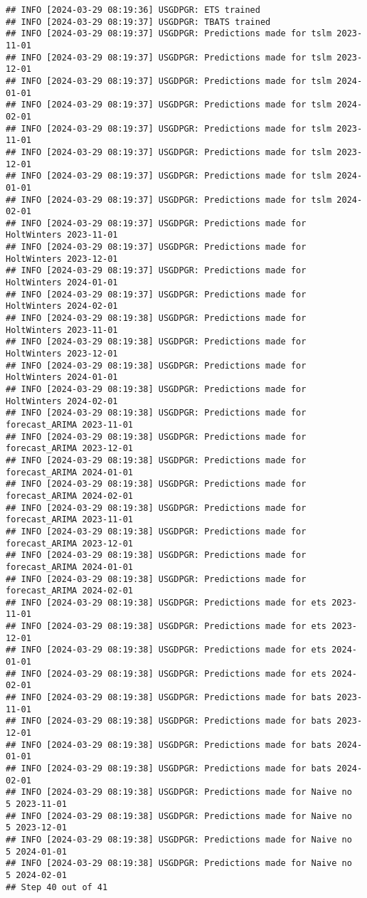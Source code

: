 \documentclass[
]{article}
\begin{document}
\begin{verbatim}
## INFO [2024-03-29 08:19:36] USGDPGR: ETS trained
## INFO [2024-03-29 08:19:37] USGDPGR: TBATS trained
## INFO [2024-03-29 08:19:37] USGDPGR: Predictions made for tslm 2023-11-01
## INFO [2024-03-29 08:19:37] USGDPGR: Predictions made for tslm 2023-12-01
## INFO [2024-03-29 08:19:37] USGDPGR: Predictions made for tslm 2024-01-01
## INFO [2024-03-29 08:19:37] USGDPGR: Predictions made for tslm 2024-02-01
## INFO [2024-03-29 08:19:37] USGDPGR: Predictions made for tslm 2023-11-01
## INFO [2024-03-29 08:19:37] USGDPGR: Predictions made for tslm 2023-12-01
## INFO [2024-03-29 08:19:37] USGDPGR: Predictions made for tslm 2024-01-01
## INFO [2024-03-29 08:19:37] USGDPGR: Predictions made for tslm 2024-02-01
## INFO [2024-03-29 08:19:37] USGDPGR: Predictions made for HoltWinters 2023-11-01
## INFO [2024-03-29 08:19:37] USGDPGR: Predictions made for HoltWinters 2023-12-01
## INFO [2024-03-29 08:19:37] USGDPGR: Predictions made for HoltWinters 2024-01-01
## INFO [2024-03-29 08:19:37] USGDPGR: Predictions made for HoltWinters 2024-02-01
## INFO [2024-03-29 08:19:38] USGDPGR: Predictions made for HoltWinters 2023-11-01
## INFO [2024-03-29 08:19:38] USGDPGR: Predictions made for HoltWinters 2023-12-01
## INFO [2024-03-29 08:19:38] USGDPGR: Predictions made for HoltWinters 2024-01-01
## INFO [2024-03-29 08:19:38] USGDPGR: Predictions made for HoltWinters 2024-02-01
## INFO [2024-03-29 08:19:38] USGDPGR: Predictions made for forecast_ARIMA 2023-11-01
## INFO [2024-03-29 08:19:38] USGDPGR: Predictions made for forecast_ARIMA 2023-12-01
## INFO [2024-03-29 08:19:38] USGDPGR: Predictions made for forecast_ARIMA 2024-01-01
## INFO [2024-03-29 08:19:38] USGDPGR: Predictions made for forecast_ARIMA 2024-02-01
## INFO [2024-03-29 08:19:38] USGDPGR: Predictions made for forecast_ARIMA 2023-11-01
## INFO [2024-03-29 08:19:38] USGDPGR: Predictions made for forecast_ARIMA 2023-12-01
## INFO [2024-03-29 08:19:38] USGDPGR: Predictions made for forecast_ARIMA 2024-01-01
## INFO [2024-03-29 08:19:38] USGDPGR: Predictions made for forecast_ARIMA 2024-02-01
## INFO [2024-03-29 08:19:38] USGDPGR: Predictions made for ets 2023-11-01
## INFO [2024-03-29 08:19:38] USGDPGR: Predictions made for ets 2023-12-01
## INFO [2024-03-29 08:19:38] USGDPGR: Predictions made for ets 2024-01-01
## INFO [2024-03-29 08:19:38] USGDPGR: Predictions made for ets 2024-02-01
## INFO [2024-03-29 08:19:38] USGDPGR: Predictions made for bats 2023-11-01
## INFO [2024-03-29 08:19:38] USGDPGR: Predictions made for bats 2023-12-01
## INFO [2024-03-29 08:19:38] USGDPGR: Predictions made for bats 2024-01-01
## INFO [2024-03-29 08:19:38] USGDPGR: Predictions made for bats 2024-02-01
## INFO [2024-03-29 08:19:38] USGDPGR: Predictions made for Naive no  5 2023-11-01
## INFO [2024-03-29 08:19:38] USGDPGR: Predictions made for Naive no  5 2023-12-01
## INFO [2024-03-29 08:19:38] USGDPGR: Predictions made for Naive no  5 2024-01-01
## INFO [2024-03-29 08:19:38] USGDPGR: Predictions made for Naive no  5 2024-02-01
## Step 40 out of 41
\end{verbatim}
\end{document}
